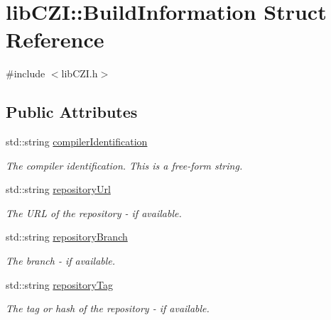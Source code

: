 \hypertarget{structlib_c_z_i_1_1_build_information}{}\section{lib\+C\+ZI\+:\+:Build\+Information Struct Reference}
\label{structlib_c_z_i_1_1_build_information}


{\ttfamily \#include $<$lib\+C\+Z\+I.\+h$>$}

\subsection*{Public Attributes}
\begin{DoxyCompactItemize}
\item 
\mbox{\label{structlib_c_z_i_1_1_build_information_afbe4e34c12ec00918b6c24cea02010fc}} 
std\+::string \hyperlink{structlib_c_z_i_1_1_build_information_afbe4e34c12ec00918b6c24cea02010fc}{compiler\+Identification}
\begin{DoxyCompactList}\small\item\em The compiler identification. This is a free-\/form string. \end{DoxyCompactList}\item 
\mbox{\label{structlib_c_z_i_1_1_build_information_ade6220dd4d87b8cf00e3d49edde9d1cd}} 
std\+::string \hyperlink{structlib_c_z_i_1_1_build_information_ade6220dd4d87b8cf00e3d49edde9d1cd}{repository\+Url}
\begin{DoxyCompactList}\small\item\em The U\+RL of the repository -\/ if available. \end{DoxyCompactList}\item 
\mbox{\label{structlib_c_z_i_1_1_build_information_ae27730fdc6cc3c6061a600d6f32d75d5}} 
std\+::string \hyperlink{structlib_c_z_i_1_1_build_information_ae27730fdc6cc3c6061a600d6f32d75d5}{repository\+Branch}
\begin{DoxyCompactList}\small\item\em The branch -\/ if available. \end{DoxyCompactList}\item 
\mbox{\label{structlib_c_z_i_1_1_build_information_a833dfce6058929d32f21133c46dc2f6d}} 
std\+::string \hyperlink{structlib_c_z_i_1_1_build_information_a833dfce6058929d32f21133c46dc2f6d}{repository\+Tag}
\begin{DoxyCompactList}\small\item\em The tag or hash of the repository -\/ if available. \end{DoxyCompactList}\end{DoxyCompactItemize}


